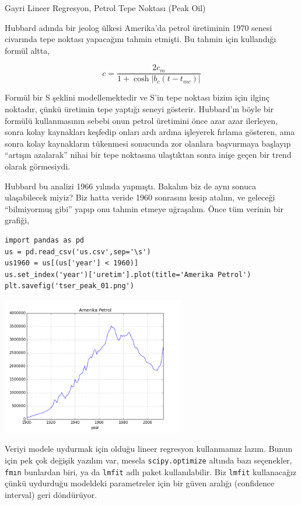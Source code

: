 \documentclass[12pt,fleqn]{article}\usepackage{../../common}
\begin{document}
Gayri Lineer Regresyon, Petrol Tepe Noktası (Peak Oil)

Hubbard adında bir jeolog ülkesi Amerika'da petrol üretiminin 1970 senesi
civarında tepe noktası yapacağını tahmin etmişti. Bu tahmin için kullandığı
formül altta,

$$ 
c = \frac{ 2c_m}{1 + \cosh |b_c(t-t_{mc})|   }
$$

Formül bir S şeklini modellemektedir ve S'in tepe noktası bizim için ilginç
noktadır, çünkü üretimin tepe yaptığı seneyi gösterir. Hubbard'ın böyle bir
formülü kullanmasının sebebi onun petrol üretimini önce azar azar
ilerleyen, sonra kolay kaynakları keşfedip onları ardı ardına işleyerek
fırlama gösteren, ama sonra kolay kaynakların tükenmesi sonucunda zor
olanlara başvurmaya başlayıp ``artışın azalarak'' nihai bir tepe noktasına
ulaştıktan sonra inişe geçen bir trend olarak görmesiydi.

Hubbard bu analizi 1966 yılında yapmıştı. Bakalım biz de aynı sonuca
ulaşabilecek miyiz? Biz hatta veride 1960 sonrasını kesip atalım, ve
geleceği ``bilmiyormuş gibi'' yapıp onu tahmin etmeye uğraşalım. Önce tüm
verinin bir grafiği,

\begin{verbatim}
import pandas as pd
us = pd.read_csv('us.csv',sep='\s')
us1960 = us[(us['year'] < 1960)]
us.set_index('year')['uretim'].plot(title='Amerika Petrol')
plt.savefig('tser_peak_01.png')
\end{verbatim}

\includegraphics[height=6cm]{tser_peak_01.png}

Veriyi modele uydurmak için olduğu lineer regresyon kullanmamız lazım. Bunun
için pek çok değişik yazılım var, mesela \verb!scipy.optimize! altında bazı
seçenekler, \verb!fmın! bunlardan biri, ya da \verb!lmfit! adlı paket
kullanılabilir. Biz \verb!lmfit! kullanacağız çünkü uydurduğu modeldeki
parametreler için bir güven aralığı (confidence interval) geri döndürüyor.
\end{document}
